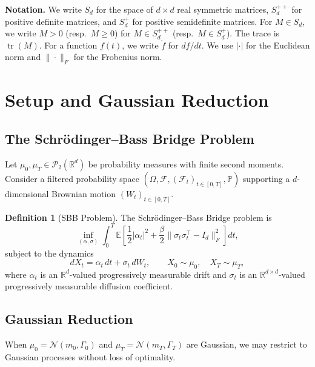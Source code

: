 \documentclass[12pt]{article}
\theoremstyle{definition}
\newtheorem{definition}[theorem]{Definition}
\newcommand{\R}{\mathbb{R}}
\newcommand{\E}{\mathbb{E}}
\newcommand{\tr}{\operatorname{tr}}
\newcommand{\Spp}{S_d^{++}}
\newcommand{\Sp}{S_d^{+}}
\begin{document}
\medskip

\noindent\textbf{Notation.}
We write $S_d$ for the space of $d\times d$ real symmetric matrices,
$\Spp$ for positive definite matrices, and $\Sp$ for positive semidefinite
matrices.
For $M \in S_d$, we write $M > 0$ (resp.\ $M \ge 0$) for $M \in \Spp$
(resp.\ $M \in \Sp$).
The trace is $\tr(M)$.
For a function $f(t)$, we write $\dot f$ for $df/dt$.
We use $|\cdot|$ for the Euclidean norm and $\|\cdot\|_F$ for the Frobenius
norm.

\section{Setup and Gaussian Reduction}\label{sec:setup}

\subsection{The Schr\"odinger--Bass Bridge Problem}

Let $\mu_0, \mu_T \in \mathcal{P}_2(\R^d)$ be probability measures with
finite second moments.
Consider a filtered probability space
$(\Omega, \mathcal{F}, (\mathcal{F}_t)_{t\in[0,T]}, \mathbb{P})$ supporting
a $d$-dimensional Brownian motion $(W_t)_{t\in[0,T]}$.

\begin{definition}[SBB Problem]\label{def:sbb}
The Schr\"odinger--Bass Bridge problem is
\begin{equation}\label{eq:sbb}
\inf_{(\alpha, \sigma)} \int_0^T \E\!\left[\frac{1}{2}|\alpha_t|^2 +
  \frac{\beta}{2}\|\sigma_t \sigma_t^\top - I_d\|_F^2\right] dt,
\end{equation}
subject to the dynamics
\begin{equation}\label{eq:dynamics}
dX_t = \alpha_t \, dt + \sigma_t \, dW_t, \qquad
X_0 \sim \mu_0, \quad X_T \sim \mu_T,
\end{equation}
where $\alpha_t$ is an $\R^d$-valued progressively measurable drift
and $\sigma_t$ is an $\R^{d\times d}$-valued progressively measurable
diffusion coefficient.
\end{definition}

\subsection{Gaussian Reduction}

When $\mu_0 = \mathcal{N}(m_0, \Gamma_0)$ and
$\mu_T = \mathcal{N}(m_T, \Gamma_T)$ are Gaussian, we may restrict to
Gaussian processes without loss of optimality.
\end{document}
